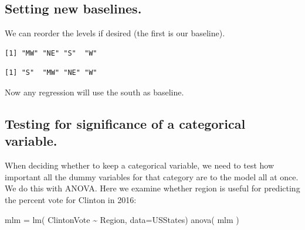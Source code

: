 \documentclass[
  letterpaper,
  DIV=11,
  numbers=noendperiod]{scrreprt}
\newenvironment{Shaded}{\begin{snugshade}}{\end{snugshade}}
\newcommand{\AttributeTok}[1]{\textcolor[rgb]{0.49,0.56,0.16}{#1}}
\newcommand{\FunctionTok}[1]{\textcolor[rgb]{0.02,0.16,0.49}{#1}}
\newcommand{\NormalTok}[1]{\textcolor[rgb]{0.00,0.44,0.13}{#1}}
\newcommand{\OtherTok}[1]{\textcolor[rgb]{0.00,0.44,0.13}{#1}}
\newcommand{\SpecialCharTok}[1]{\textcolor[rgb]{0.25,0.44,0.63}{#1}}
\newcommand{\StringTok}[1]{\textcolor[rgb]{0.25,0.44,0.63}{#1}}
\begin{document}
\hypertarget{setting-new-baselines.}{%
\subsection{Setting new baselines.}\label{setting-new-baselines.}}

We can reorder the levels if desired (the first is our baseline).

\begin{Shaded}
\end{Shaded}

\begin{verbatim}
[1] "MW" "NE" "S"  "W" 
\end{verbatim}

\begin{Shaded}
\end{Shaded}

\begin{verbatim}
[1] "S"  "MW" "NE" "W" 
\end{verbatim}

Now any regression will use the south as baseline.

\hypertarget{testing-for-significance-of-a-categorical-variable.}{%
\subsection{Testing for significance of a categorical
variable.}\label{testing-for-significance-of-a-categorical-variable.}}

When deciding whether to keep a categorical variable, we need to test
how important all the dummy variables for that category are to the model
all at once. We do this with ANOVA. Here we examine whether region is
useful for predicting the percent vote for Clinton in 2016:

\begin{Shaded}
\begin{Highlighting}[]
\NormalTok{mlm }\OtherTok{=} \FunctionTok{lm}\NormalTok{( ClintonVote }\SpecialCharTok{\textasciitilde{}}\NormalTok{ Region, }\AttributeTok{data=}\NormalTok{USStates)}
\FunctionTok{anova}\NormalTok{( mlm )}
\end{Highlighting}
\end{Shaded}
\end{document}
